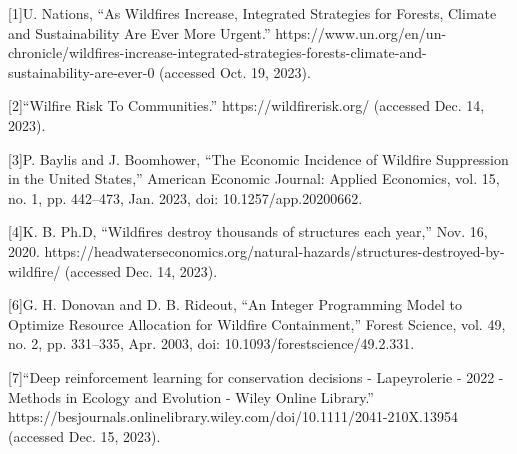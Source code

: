 \documentclass[lettersize,journal]{IEEEtran}
\begin{document}





[1]U. Nations, “As Wildfires Increase, Integrated Strategies for Forests, Climate and Sustainability Are Ever More Urgent.” https://www.un.org/en/un-chronicle/wildfires-increase-integrated-strategies-forests-climate-and-sustainability-are-ever-0 (accessed Oct. 19, 2023).

[2]“Wilfire Risk To Communities.” https://wildfirerisk.org/ (accessed Dec. 14, 2023). 

[3]P. Baylis and J. Boomhower, “The Economic Incidence of Wildfire Suppression in the United States,” American Economic Journal: Applied Economics, vol. 15, no. 1, pp. 442–473, Jan. 2023, doi: 10.1257/app.20200662. 

[4]K. B. Ph.D, “Wildfires destroy thousands of structures each year,” Nov. 16, 2020. https://headwaterseconomics.org/natural-hazards/structures-destroyed-by-wildfire/ (accessed Dec. 14, 2023).

[6]G. H. Donovan and D. B. Rideout, “An Integer Programming Model to Optimize Resource Allocation for Wildfire Containment,” Forest Science, vol. 49, no. 2, pp. 331–335, Apr. 2003, doi: 10.1093/forestscience/49.2.331. 

[7]“Deep reinforcement learning for conservation decisions - Lapeyrolerie - 2022 - Methods in Ecology and Evolution - Wiley Online Library.” https://besjournals.onlinelibrary.wiley.com/doi/10.1111/2041-210X.13954 (accessed Dec. 15, 2023). 
\end{document}
